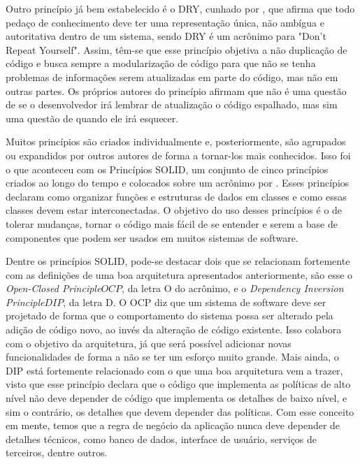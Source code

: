 \documentclass[12pt, %
openright, 
oneside, %
a4paper,    %
brazil]{facom-ufu-abntex2}
\begin{document}
Outro princípio já bem estabelecido é o DRY, cunhado por , que afirma que todo pedaço de conhecimento deve ter uma representação única, não ambígua e autoritativa dentro de um sistema, sendo DRY é um acrônimo para "Don't Repeat Yourself". Assim, têm-se que esse princípio objetiva a não duplicação de código e busca sempre a modularização de código para que não se tenha problemas de informações serem atualizadas em parte do código, mas não em outras partes. Os próprios autores do princípio afirmam que não é uma questão de se o desenvolvedor irá lembrar de atualização o código espalhado, mas sim uma questão de quando ele irá esquecer.

Muitos princípios são criados individualmente e, posteriormente, são agrupados ou expandidos por outros autores de forma a tornar-los mais conhecidos. Isso foi o que aconteceu com os Princípios SOLID, um conjunto de cinco princípios criados ao longo do tempo e colocados sobre um acrônimo por . Esses princípios declaram como organizar funções e estruturas de dados em classes e como essas classes devem estar interconectadas. O objetivo do uso desses princípios é o de tolerar mudanças, tornar o código mais fácil de se entender e serem a base de componentes que podem ser usados em muitos sistemas de software.

Dentre os princípios SOLID, pode-se destacar dois que se relacionam fortemente com as definições de uma boa arquitetura apresentados anteriormente, são esse o \textit{Open-Closed Principle\(OCP\)}, da letra O do acrônimo, e o \textit{Dependency Inversion Principle\(DIP\)}, da letra D. O OCP diz que um sistema de software deve ser projetado de forma que o comportamento do sistema possa ser alterado pela adição de código novo, ao invés da alteração de código existente. Isso colabora com o objetivo da arquitetura, já que será possível adicionar novas funcionalidades de forma a não se ter um esforço muito grande. Mais ainda, o DIP está fortemente relacionado com o que uma boa arquitetura vem a trazer, visto que esse princípio declara que o código que implementa as políticas de alto nível não deve depender de código que implementa os detalhes de baixo nível, e sim o contrário, os detalhes que devem depender das políticas. Com esse conceito em mente, temos que a regra de negócio da aplicação nunca deve depender de detalhes técnicos, como banco de dados, interface de usuário, serviços de terceiros, dentre outros.
\end{document}
